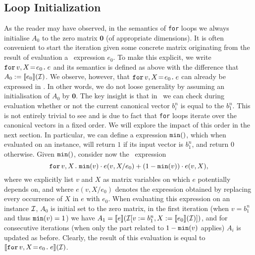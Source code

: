 \subsection{Loop Initialization} As the reader may have observed, in the semantics of \texttt{for} loops we 
always initialise $A_0$ to the zero matrix $\mathbf{0}$ (of appropriate dimensions). It is often convenient
to start the iteration given some concrete matrix  originating from the result of evaluation a \langfor\ expression $e_0$. To make this explicit, we write $\initf{e_0}{v}{X}{e}$ and its semantics is defined as above
with the difference that $A_0:=\sem{e_0}{\I}$. We observe, however, that $\initf{e_0}{v}{X}{e}$ can already
be expressed in \langfor. In other words, we do not loose generality by assuming an initialisation of $A_0$ by $\mathbf{0}$.
The key insight is that in \langfor\ we can check during evaluation whether or not
the current canonical vector $b_i^n$ is equal to the $b_1^n$. This is not entirely trivial to see and is due to fact that \texttt{for} loops iterate over the canonical vectors in a fixed order. We will explore the impact of this order in the next section. In particular, we can define a \langfor expression $\mmin$, which when evaluated on an instance, will return $1$ if its input vector is $b_1^n$, and return $0$ otherwise. Given $\mmin$, consider now the
\langfor\ expression
 $$\ffor{v}{X}{\mmin{v}\cdot e(v,X/e_0) + (1-\mmin{v})\cdot e(v,X)},$$
 where we explicitly list $v$ and $X$ as matrix variables on which $e$ potentially depends on, and where
 $e(v,X/e_0)$ denotes the expression obtained by replacing every occurrence of $X$ in $e$ with $e_0$.
%
When evaluating this expression on an instance $\I$, $A_0$ is initial set to the zero matrix, in the first iteration (when  $v=b_1^n$ and thus $\mmin{v}=1$)
we have $A_1=\sem{e}{\I[v:=b_1^n,X:=\sem{e_0}{\I}]}$, and for consecutive iterations (when only the part related to $1-\mmin{v}$ applies) $A_i$ is updated as before. Clearly, the result of this evaluation is equal to
$\sem{\initf{e_0}{v}{X}{e}}{\I}$. 

